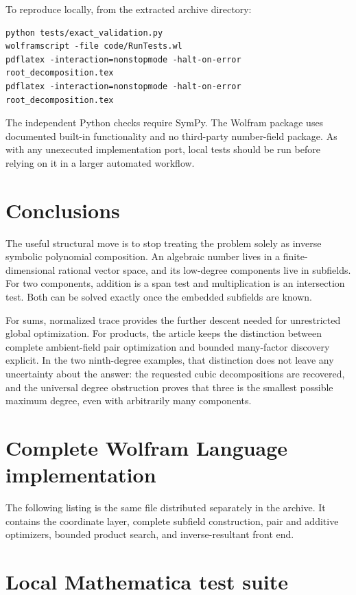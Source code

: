 \documentclass[11pt,a4paper]{article}
\theoremstyle{remark}\newtheorem{remark}[theorem]{Remark}
\begin{document}
To reproduce locally, from the extracted archive directory:
\begin{lstlisting}[language={}]
python tests/exact_validation.py
wolframscript -file code/RunTests.wl
pdflatex -interaction=nonstopmode -halt-on-error root_decomposition.tex
pdflatex -interaction=nonstopmode -halt-on-error root_decomposition.tex
\end{lstlisting}
The independent Python checks require SymPy. The Wolfram package uses documented built-in functionality and no third-party number-field package. As with any unexecuted implementation port, local tests should be run before relying on it in a larger automated workflow.

\section{Conclusions}
The useful structural move is to stop treating the problem solely as inverse symbolic polynomial composition. An algebraic number lives in a finite-dimensional rational vector space, and its low-degree components live in subfields. For two components, addition is a span test and multiplication is an intersection test. Both can be solved exactly once the embedded subfields are known.

For sums, normalized trace provides the further descent needed for unrestricted global optimization. For products, the article keeps the distinction between complete ambient-field pair optimization and bounded many-factor discovery explicit. In the two ninth-degree examples, that distinction does not leave any uncertainty about the answer: the requested cubic decompositions are recovered, and the universal degree obstruction proves that three is the smallest possible maximum degree, even with arbitrarily many components.

\appendix
\section{Complete Wolfram Language implementation}
\label{app:wl}
The following listing is the same file distributed separately in the archive. It contains the coordinate layer, complete subfield construction, pair and additive optimizers, bounded product search, and inverse-resultant front end.


\section{Local Mathematica test suite}

\end{document}
